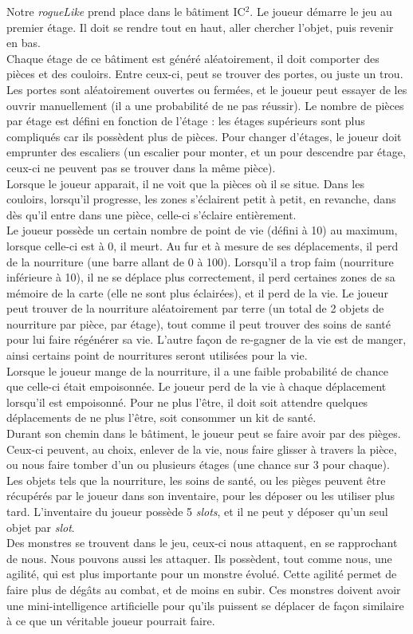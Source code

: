 \documentclass[11pt]{report}
\begin{document}
	Notre \emph{rogueLike} prend place dans le bâtiment IC$^2$. Le joueur démarre le jeu au premier étage. Il doit se rendre tout en haut, aller chercher l'objet, puis revenir en bas.\\
	Chaque étage de ce bâtiment est généré aléatoirement, il doit comporter des pièces et des couloirs. Entre ceux-ci, peut se trouver des portes, ou juste un trou. Les portes sont aléatoirement ouvertes ou fermées, et le joueur peut essayer de les ouvrir manuellement (il a une probabilité de ne pas réussir). Le nombre de pièces par étage est défini en fonction de l'étage : les étages supérieurs sont plus compliqués car ils possèdent plus de pièces. Pour changer d'étages, le joueur doit emprunter des escaliers (un escalier pour monter, et un pour descendre par étage, ceux-ci ne peuvent pas se trouver dans la même pièce).\\
	Lorsque le joueur apparait, il ne voit que la pièces où il se situe. Dans les couloirs, lorsqu'il progresse, les zones s'éclairent petit à petit, en revanche, dans dès qu'il entre dans une pièce, celle-ci s'éclaire entièrement.\\
	Le joueur possède un certain nombre de point de vie (défini à 10) au maximum, lorsque celle-ci est à 0, il meurt. Au fur et à mesure de ses déplacements, il perd de la nourriture (une barre allant de 0 à 100). Lorsqu'il a trop faim (nourriture inférieure à 10), il ne se déplace plus correctement, il perd certaines zones de sa mémoire de la carte (elle ne sont plus éclairées), et il perd de la vie. Le joueur peut trouver de la nourriture aléatoirement par terre (un total de 2 objets de nourriture par pièce, par étage), tout comme il peut trouver des soins de santé pour lui faire régénérer sa vie. L'autre façon de re-gagner de la vie est de manger, ainsi certains point de nourritures seront utilisées pour la vie.\\
	Lorsque le joueur mange de la nourriture, il a une faible probabilité de chance que celle-ci était empoisonnée. Le joueur perd de la vie à chaque déplacement lorsqu'il est empoisonné. Pour ne plus l'être, il doit soit attendre quelques déplacements de ne plus l'être, soit consommer un kit de santé.\\
	Durant son chemin dans le bâtiment, le joueur peut se faire avoir par des pièges. Ceux-ci peuvent, au choix, enlever de la vie, nous faire glisser à travers la pièce, ou nous faire tomber d'un ou plusieurs étages (une chance sur 3 pour chaque).\\
	Les objets tels que la nourriture, les soins de santé, ou les pièges peuvent être récupérés par le joueur dans son inventaire, pour les déposer ou les utiliser plus tard. L'inventaire du joueur possède 5 \emph{slots}, et il ne peut y déposer qu'un seul objet par \emph{slot}.\\
	Des monstres se trouvent dans le jeu, ceux-ci nous attaquent, en se rapprochant de nous. Nous pouvons aussi les attaquer. Ils possèdent, tout comme nous, une agilité, qui est plus importante pour un monstre évolué. Cette agilité permet de faire plus de dégâts au combat, et de moins en subir. Ces monstres doivent avoir une mini-intelligence artificielle pour qu'ils puissent se déplacer de façon similaire à ce que un véritable joueur pourrait faire.
	
\end{document}
